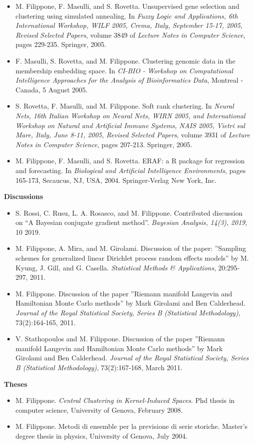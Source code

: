 \begin{itemize}
\item  M. Filippone, F. Masulli, and S. Rovetta. Unsupervised gene selection and clustering using simulated annealing. In \emph{Fuzzy Logic and Applications, 6th International Workshop, WILF 2005, Crema, Italy, September 15-17, 2005, Revised Selected Papers}, volume 3849 of \emph{Lecture Notes in Computer Science}, pages 229-235. Springer, 2005.  
\item  F. Masulli, S. Rovetta, and M. Filippone. Clustering genomic data in the membership embedding space. In \emph{CI-BIO - Workshop on Computational Intelligence Approaches for the Analysis of Bioinformatics Data}, Montreal - Canada, 5 August 2005. 
\item  S. Rovetta, F. Masulli, and M. Filippone. Soft rank clustering. In \emph{Neural Nets, 16th Italian Workshop on Neural Nets, WIRN 2005, and International Workshop on Natural and Artificial Immune Systems, NAIS 2005, Vietri sul Mare, Italy, June 8-11, 2005, Revised Selected Papers}, volume 3931 of \emph{Lecture Notes in Computer Science}, pages 207-213. Springer, 2005.  
\item  M. Filippone, F. Masulli, and S. Rovetta. ERAF: a R package for regression and forecasting. In \emph{Biological and Artificial Intelligence Environments}, pages 165-173, Secaucus, NJ, USA, 2004. Springer-Verlag New York, Inc. 

\end{itemize}\textbf{Discussions}\begin{itemize}\item  S. Rossi, C. Rusu, L. A. Rosasco, and M. Filippone. Contributed discussion on ``A Bayesian conjugate gradient method''. \emph{Bayesian Analysis, 14(3), 2019}, 10 2019.  
\item  M. Filippone, A. Mira, and M. Girolami. Discussion of the paper: ”Sampling schemes for generalized linear Dirichlet process random effects models” by M. Kyung, J. Gill, and G. Casella. \emph{Statistical Methods \& Applications}, 20:295-297, 2011.  
\item  M. Filippone. Discussion of the paper ”Riemann manifold Langevin and Hamiltonian Monte Carlo methods” by Mark Girolami and Ben Calderhead. \emph{Journal of the Royal Statistical Society, Series B (Statistical Methodology)}, 73(2):164-165, 2011.  
\item  V. Stathopoulos and M. Filippone. Discussion of the paper ”Riemann manifold Langevin and Hamiltonian Monte Carlo methods” by Mark Girolami and Ben Calderhead. \emph{Journal of the Royal Statistical Society, Series B (Statistical Methodology)}, 73(2):167-168, March 2011.  

\end{itemize}\textbf{Theses}\begin{itemize}\item  M. Filippone. \emph{Central Clustering in Kernel-Induced Spaces}. Phd thesis in computer science, University of Genova, February 2008. 
\item  M. Filippone. Metodi di ensemble per la previsione di serie storiche. Master's degree thesis in physics, University of Genova, July 2004. 

\end{itemize}
